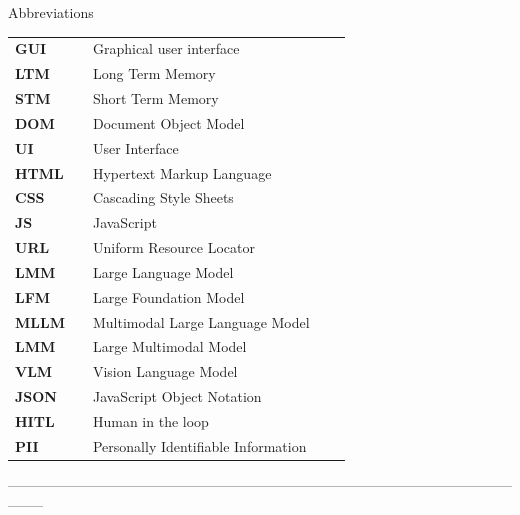 
\newpage
{}
\begin{Huge}
Abbreviations\\
\end{Huge}

\begin{tabular}{ l p{3.1cm}l p{4cm}l }
\textbf{GUI} & & Graphical user interface \\
\textbf{LTM} & & Long Term Memory \\
\textbf{STM} & & Short Term Memory \\
\textbf{DOM} & & Document Object Model \\
\textbf{UI} & & User Interface \\
\textbf{HTML} & & Hypertext Markup Language \\
\textbf{CSS} & & Cascading Style Sheets \\
\textbf{JS} & & JavaScript \\
\textbf{URL} & & Uniform Resource Locator \\
\textbf{LMM} & & Large Language Model \\
\textbf{LFM} & & Large Foundation Model \\
\textbf{MLLM} & & Multimodal Large Language Model \\
\textbf{LMM} & & Large Multimodal Model \\
\textbf{VLM} & & Vision Language Model \\
\textbf{JSON} & & JavaScript Object Notation \\
\textbf{HITL} & & Human in the loop \\
\textbf{PII} & & Personally Identifiable Information\\

\end{tabular}


--------------------------------------------------------------------------------------------------------------------\\

